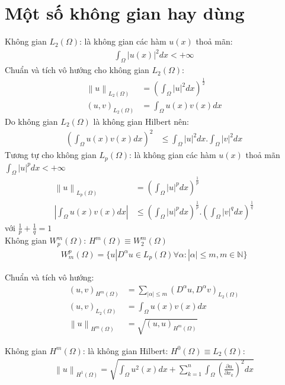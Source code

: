 \documentclass[14pt]{extreport}
\begin{document}
\section{Một số không gian hay dùng}
Không gian $L_2(\Omega)$: là không gian các hàm $u(x)$ thoả mãn:
\begin{align*}
\int_{\Omega}\left |  u(x)\right |^{2}dx < +\infty 
\end{align*}
Chuẩn và tích vô hướng cho không gian $L_2(\Omega)$:
\begin{align*}
\left \| u \right \|_{L_2(\Omega)} &= \left ( \int_{\Omega}\left |  u\right |^{2}dx \right )^{\frac{1}{2}}\\
(u,v)_{L_2(\Omega)} &= \int_{\Omega}u(x)v(x)dx
\end{align*}
Do không gian $L_2(\Omega)$ là không gian Hilbert nên:
\begin{align*}
\left ( \int_{\Omega}u(x)v(x)dx \right )^2 &\leq \int_{\Omega}\left |  u\right |^{2}dx. \int_{\Omega}\left |  v\right |^{2}dx
\end{align*}
Tương tự cho không gian $L_p(\Omega)$: là không gian các hàm $u(x)$ thoả mãn $\int_{\Omega}\left |  u\right |^{p}dx < +\infty $
\begin{align*}
\left \| u \right \|_{L_p(\Omega)} &= \left ( \int_{\Omega}\left |  u\right |^{p}dx \right )^{\frac{1}{p}}\\
\left | \int_{\Omega}u(x)v(x)dx \right | &\leq \left ( \int_{\Omega}\left |  u\right |^{p}dx \right )^{\frac{1}{p}}.\left ( \int_{\Omega}\left |  v\right |^{q}dx \right )^{\frac{1}{q}}
\end{align*}
với $\frac{1}{p}+\frac{1}{q}=1$\\
Không gian $W_p^m(\Omega)$:  $H^m(\Omega) \equiv  W^m_2(\Omega)$
\begin{align*}
W_m^p(\Omega) = \{ u | D^{\alpha}u \in L_p(\Omega) \forall \alpha : |\alpha|\leq m, m \in \mathbb{N}\}
\end{align*}

Chuẩn và tích vô hướng:
\begin{align*}
(u,v)_{H^m(\Omega)} &= \sum_{|\alpha|\leq m}(D^{\alpha}u, D^{\alpha}v)_{L_2(\Omega)}\\
(u,v)_{L_2(\Omega)} &= \int_{\Omega}u(x)v(x)dx\\
\left \|  u\right \|_{H^m(\Omega)} &= \sqrt{(u,u)_{H^m(\Omega)}}
\end{align*}

Không gian $H^m(\Omega)$: là không gian Hilbert: $H^0(\Omega) \equiv  L_2(\Omega)$:
\begin{align*}
\left \| u \right \|_{H^1(\Omega)}= \sqrt{\int_{\Omega}u^2(x)dx+\sum_{k=1}^n\int_{\Omega}\left ( \frac{\partial u}{\partial x_k} \right )^2dx}
\end{align*}
\end{document}
